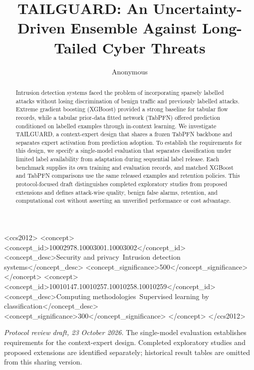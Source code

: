 \documentclass[sigconf,anonymous,pbalance]{acmart}
\begin{document}
\title{TAILGUARD: An Uncertainty-Driven Ensemble
Against Long-Tailed Cyber Threats}
\author{Anonymous}

\begin{abstract}
Intrusion detection systems faced the problem of incorporating sparsely labelled attacks without losing discrimination of benign traffic and previously labelled attacks.
Extreme gradient boosting (XGBoost) provided a strong baseline for tabular flow records, while a tabular prior-data fitted network (TabPFN) offered prediction conditioned on labelled examples through in-context learning.
We investigate TAILGUARD, a context-expert design that shares a frozen TabPFN backbone and separates expert activation from prediction adoption.
To establish the requirements for this design, we specify a single-model evaluation that separates classification under limited label availability from adaptation during sequential label release.
Each benchmark supplies its own training and evaluation records, and matched XGBoost and TabPFN comparisons use the same released examples and retention policies.
This protocol-focused draft distinguishes completed exploratory studies from proposed extensions and defines attack-wise quality, benign false alarms, retention, and computational cost without asserting an unverified performance or cost advantage.
\end{abstract}

\begin{CCSXML}
<ccs2012>
 <concept>
  <concept_id>10002978.10003001.10003002</concept_id>
  <concept_desc>Security and privacy~Intrusion detection systems</concept_desc>
  <concept_significance>500</concept_significance>
 </concept>
 <concept>
  <concept_id>10010147.10010257.10010258.10010259</concept_id>
  <concept_desc>Computing methodologies~Supervised learning by classification</concept_desc>
  <concept_significance>300</concept_significance>
 </concept>
</ccs2012>
\end{CCSXML}
\maketitle

\noindent\textit{Protocol review draft, 23 October 2026.} The single-model evaluation establishes requirements for the context-expert design. Completed exploratory studies and proposed extensions are identified separately; historical result tables are omitted from this sharing version.
\end{document}
